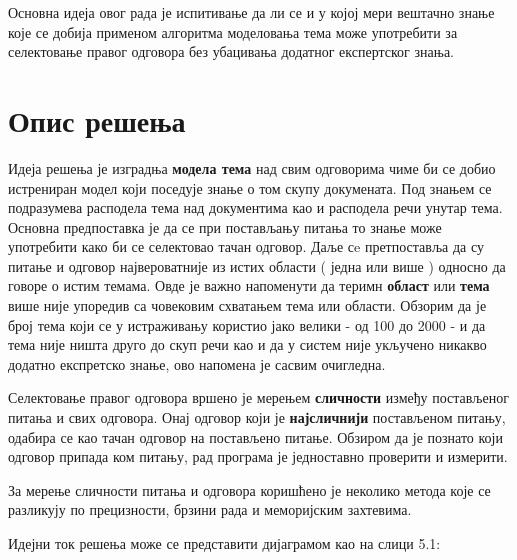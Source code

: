 Основна идеја овог рада је испитивање да ли се и у којој мери вештачно знање које се добија применом алгоритма моделовања тема може употребити за селектовање правог одговора без убацивања додатног експертског знања.


\section{Опис решења}

Идеја решења је изградња \textbf{модела тема} над свим одговорима чиме би се добио истрениран модел који поседује знање о том скупу докумената. Под знањем се подразумева расподела тема над документима као и расподела речи унутар тема. Основна предпоставка је да се при постављању питања то знање може употребити како би се селектовао тачан одговор. Даље сe претпоставља да су  питање и одговор  највероватније из истих области ( једна или више ) односно да говоре о истим темама. Овде је важно напоменути да теримн \textbf{област} или \textbf{тема} више није упоредив са човековим схватањем тема или области. Обзорим да је број тема који се у истраживању користио јако велики - од 100 до 2000 - и да тема није ништа друго до скуп речи као и да у систем није укључено никакво додатно експретско знање, ово напомена је сасвим очигледна.

Селектовање правог одговора вршено је мерењем \textbf{сличности} између постављеног питања и свих одговора. Онај одговор који је \textbf{најсличнији} постављеном питању, одабира се као тачан одговор на постављено питање. Обзиром да је познато који одговор припада ком питању, рад програма је једноставно проверити и измерити.

За мерење сличности питања и одговора коришћено је неколико метода које се разликују  по прецизности, брзини рада и меморијским захтевима. 


Идејни ток решења може се представити  дијаграмом као на слици 5.1:

